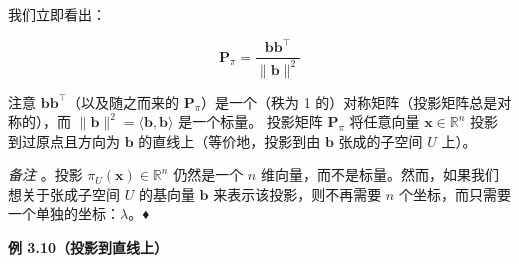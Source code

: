 我们立即看出：

\begin{equation}
\boldsymbol{P}_\pi = \frac{\boldsymbol{b} \boldsymbol{b}^\top}{\|\boldsymbol{b}\|^2}
\tag{3.46}\label{eq:3-46}
\end{equation}

注意 $ \boldsymbol{b} \boldsymbol{b}^\top $（以及随之而来的 $ \boldsymbol{P}_\pi $）是一个（秩为 1 的）对称矩阵（投影矩阵总是对称的），而 $ \|\boldsymbol{b}\|^2 = \langle \boldsymbol{b}, \boldsymbol{b} \rangle $ 是一个标量。 投影矩阵 $ \boldsymbol{P}_\pi $ 将任意向量 $ \boldsymbol{x} \in \mathbb{R}^n $ 投影到过原点且方向为 $ \boldsymbol{b} $ 的直线上（等价地，投影到由 $ \boldsymbol{b} $ 张成的子空间 $ U $ 上）。

\emph{备注} 。投影 $ \pi_U(\boldsymbol{x}) \in \mathbb{R}^n $ 仍然是一个 $ n $ 维向量，而不是标量。然而，如果我们想关于张成子空间 $ U $ 的基向量 $ \boldsymbol{b} $ 来表示该投影，则不再需要 $ n $ 个坐标，而只需要一个单独的坐标：$ \lambda $。♦

\begin{notebox}
\textbf{例 3.10（投影到直线上）}
\end{notebox}

